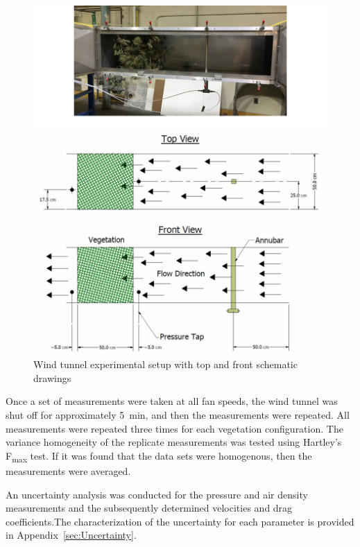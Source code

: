 \documentclass[12pt]{article}
\begin{document}
\begin{figure} [!]
	\centering 	
    \includegraphics[width=\textwidth,keepaspectratio]{Picture6a.jpg}
	\caption[Wind tunnel experimental setup]{Wind tunnel experimental setup with top and front schematic drawings }
	\label{fig:WindtunnelPic}
\end{figure}


Once a set of measurements were taken at all fan speeds, the wind tunnel was shut off for approximately 5~\si{min}, and then the measurements were repeated. All measurements were repeated three times for each vegetation configuration. The variance homogeneity of the replicate measurements was tested using Hartley's F\textsubscript{max} test. If it was found that the data sets were homogenous, then the measurements were averaged.

An uncertainty analysis was conducted for the pressure and air density measurements and the subsequently determined velocities and drag coefficients.The characterization of the uncertainty for each parameter is provided in Appendix~\ref{sec:Uncertainty}.
\end{document}
